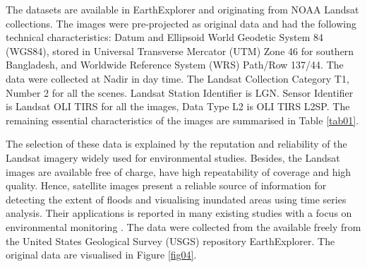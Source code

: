 \documentclass[water,article,submit,pdftex,moreauthors]{Definitions/mdpi}
\begin{document}
The datasets are available in EarthExplorer and originating from NOAA Landsat collections. The images were pre-projected as original data and had the following technical characteristics: Datum and Ellipsoid World Geodetic System 84 (WGS84), stored in Universal Transverse Mercator (UTM) Zone 46 for southern Bangladesh, and Worldwide Reference System (WRS) Path/Row 137/44. The data were collected at Nadir in day time. The Landsat Collection Category T1, Number 2 for all the scenes. Landsat Station Identifier is LGN. Sensor Identifier is Landsat OLI TIRS for all the images, Data Type L2 is OLI TIRS L2SP. The remaining essential characteristics of the images are summarised in Table \ref{tab01}.

The selection of these data is explained by the reputation and reliability of the Landsat imagery widely used for environmental studies. Besides, the Landsat images are available free of charge, have high repeatability of coverage and high quality. Hence, satellite images present a reliable source of information for detecting the extent of floods and visualising inundated areas using time series analysis. Their applications is reported in many existing studies with a focus on environmental monitoring \cite{Sheonty,Islam2016,Lemenkova202229,Ferdous,Lemenkova202321}. The data were collected from the available freely from the United States Geological Survey (USGS) repository EarthExplorer. The original data are visualised in Figure \ref{fig04}. 
\end{document}

